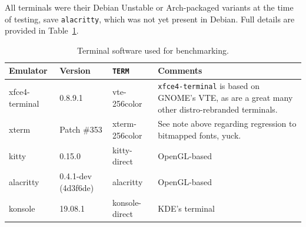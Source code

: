All terminals were their Debian Unstable or Arch-packaged variants at the time
of testing, save \texttt{alacritty}, which was not yet present in Debian. Full
details are provided in Table~\ref{table:benchterms}.

\begin{table}
  \centering
  \begin{tabular}{|l|l|l|p{}|}
    \hline
    Emulator & Version & \texttt{TERM} & Comments \\
    \hline
    \hline
    xfce4-terminal & 0.8.9.1 & vte-256color & \texttt{xfce4-terminal} is based on GNOME's VTE\cite{gnomevte}, as are a great many other distro-rebranded terminals. \\
    \hline
    xterm & Patch \#353 & xterm-256color & See note above regarding regression to bitmapped fonts, yuck. \\
    \hline
    kitty & 0.15.0 & kitty-direct & OpenGL-based \\
    \hline
    alacritty & 0.4.1-dev (4d3f6de) & alacritty & OpenGL-based \\
    \hline
    konsole & 19.08.1 & konsole-direct & KDE's terminal \\
    \hline
  \end{tabular}
\caption{Terminal software used for benchmarking.}
\label{table:benchterms}
\end{table}

